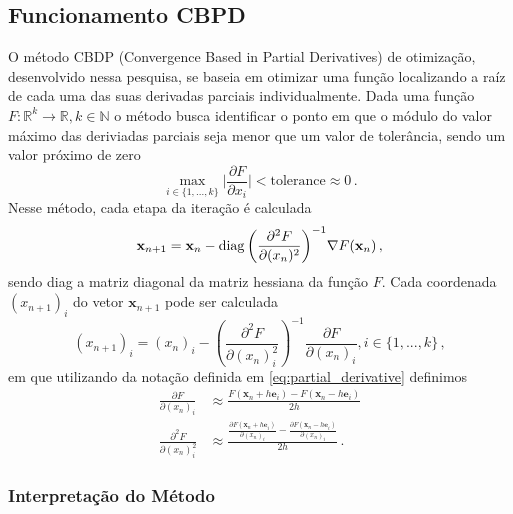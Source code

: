 \subsection{Funcionamento CBPD}
\label{sec:cbpd-process}

O método CBDP (Convergence Based in Partial Derivatives) de otimização, desenvolvido nessa pesquisa, se baseia em otimizar uma função localizando a raíz de cada uma das suas derivadas parciais individualmente. Dada uma função $F: \mathds{R}^k \to \mathds{R}, k \in \mathds{N}$ o método busca identificar o ponto em que o módulo do valor máximo das deriviadas parciais seja menor que um valor de tolerância, sendo um valor próximo de zero
%
\begin{equation}
  \label{eq:convergence-criteria}
  \max_{i \in \{1,...,k\} } \Bigg| \frac{ \partial F}{\partial x_i} \Bigg| < \text{tolerance} \approx 0 \,.
\end{equation}
%
Nesse método, cada etapa da iteração é calculada
%
\begin{equation}
  \mathbf{x}_{n+1} = \mathbf{x}_n - \operatorname{diag}{\left(\frac{\partial^2 F}{\partial (x_{n})^2 }\right)}^{-1} \nabla F(\mathbf{x}_n) \,,
\end{equation}
%
sendo diag a matriz diagonal da matriz hessiana da função $F$. Cada coordenada $(x_{n+1})_i$ do vetor $\mathbf{x}_{n+1}$ pode ser calculada
%
\begin{equation}
  (x_{n+1})_i = (x_{n})_i - \left( \frac{\partial^2 F}{\partial (x_{n})_i^2 } \right)^{-1} \frac{\partial F}{\partial (x_{n})_i} , i \in \{1,...,k\} \,,
\end{equation}
%
em que utilizando da notação definida em \eqref{eq:partial_derivative} definimos
%
\begin{equation}
  \label{eq:partial-derivative-aprox}
  \begin{split}
    \frac{\partial F}{\partial (x_{n})_i}      & \approx \frac{F(\mathbf{x}_n + h \mathbf{e}_i) - F(\mathbf{x}_n - h \mathbf{e}_i)}{2h} \\
    \frac{\partial^2 F}{\partial (x_{n})_i^2 } & \approx \frac{\frac{\partial F(\mathbf{x}_n + h \mathbf{e}_i) }{\partial (x_{n})_i } - \frac{\partial F(\mathbf{x}_n - h \mathbf{e}_i)}{\partial (x_{n})_i }}{2h} \,.
  \end{split}
\end{equation}


\subsubsection{Interpretação do Método}

